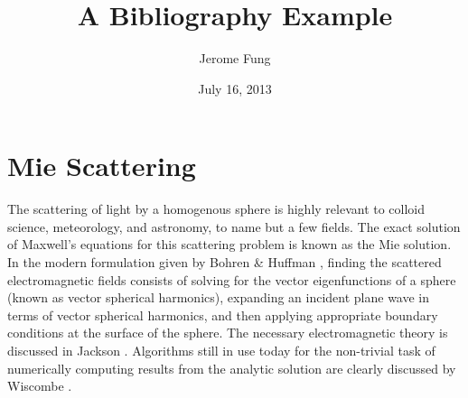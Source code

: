 \documentclass[11pt]{article}%
\begin{document}
\title{A Bibliography Example}
\author{Jerome Fung}
\date{July 16, 2013}
\maketitle

\section{Mie Scattering}
The scattering of light by a homogenous sphere is highly relevant to
colloid science, meteorology, and astronomy, to name but a few
fields. The exact solution of Maxwell's equations for this scattering
problem is known as the Mie solution. In the modern formulation given
by Bohren \& Huffman \cite{Bohren83}, finding the scattered
electromagnetic fields consists of solving for the vector
eigenfunctions of a sphere (known as vector spherical harmonics),
expanding an incident plane wave in terms of vector spherical
harmonics, and then applying appropriate boundary conditions at the
surface of the sphere. The necessary electromagnetic theory is
discussed in Jackson \cite{Jackson99}. Algorithms still in use today
for the non-trivial task of numerically computing results from the
analytic solution are clearly discussed by Wiscombe \cite{Wiscombe80}.  




\end{document}
